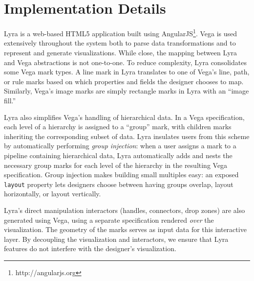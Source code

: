\section{Implementation Details}

Lyra is a web-based HTML5 application built using
AngularJS\footnote{http://angularjs.org}. Vega is used extensively throughout
the system both to parse data transformations and to represent and generate
visualizations. While close, the mapping between Lyra and Vega abstractions is
not one-to-one. To reduce complexity, Lyra consolidates some Vega mark types. A
line mark in Lyra translates to one of Vega's line, path, or rule marks based on
which properties and fields the designer chooses to map. Similarly, Vega's image
marks are simply rectangle marks in Lyra with an ``image fill.''

Lyra also simplifies Vega's handling of hierarchical data. In a Vega
specification, each level of a hierarchy is assigned to a ``group'' mark, with
children marks inheriting the corresponding subset of data. Lyra insulates users
from this scheme by automatically performing \emph{group injection}: when a user
assigns a mark to a pipeline containing hierarchical data, Lyra automatically
adds and nests the necessary group marks for each level of the hierarchy in the
resulting Vega specification. Group injection makes building small multiples
easy: an exposed \texttt{layout} property lets designers choose between having
groups overlap, layout horizontally, or layout vertically.

Lyra's direct manipulation interactors (handles, connectors, drop zones) are
also generated using Vega, using a separate specification rendered \emph{over}
the visualization. The geometry of the marks serves as input data for this
interactive layer. By decoupling the visualization and interactors, we ensure
that Lyra features do not interfere with the designer's visualization.